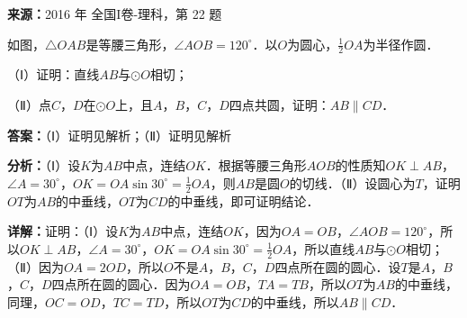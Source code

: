 \begin{question}[points=10]
\textbf{来源：}2016 年 全国I卷-理科，第 22 题\par
如图，$\triangle OAB$是等腰三角形，$\angle AOB=120^\circ$．以$O$为圆心，$\frac{1}{2}OA$为半径作圆．

（Ⅰ）证明：直线$AB$与$\odot O$相切；

（Ⅱ）点$C$，$D$在$\odot O$上，且$A$，$B$，$C$，$D$四点共圆，证明：$AB\parallel CD$．
\begin{solution}
\textbf{答案：}（Ⅰ）证明见解析；（Ⅱ）证明见解析

\textbf{分析：}（Ⅰ）设$K$为$AB$中点，连结$OK$．根据等腰三角形$AOB$的性质知$OK\perp AB$，$\angle A=30^\circ$，$OK=OA\sin30^\circ=\frac{1}{2}OA$，则$AB$是圆$O$的切线．（Ⅱ）设圆心为$T$，证明$OT$为$AB$的中垂线，$OT$为$CD$的中垂线，即可证明结论．

\textbf{详解：}证明：（Ⅰ）设$K$为$AB$中点，连结$OK$，因为$OA=OB$，$\angle AOB=120^\circ$，所以$OK\perp AB$，$\angle A=30^\circ$，$OK=OA\sin30^\circ=\frac{1}{2}OA$，所以直线$AB$与$\odot O$相切；（Ⅱ）因为$OA=2OD$，所以$O$不是$A$，$B$，$C$，$D$四点所在圆的圆心．设$T$是$A$，$B$，$C$，$D$四点所在圆的圆心．因为$OA=OB$，$TA=TB$，所以$OT$为$AB$的中垂线，同理，$OC=OD$，$TC=TD$，所以$OT$为$CD$的中垂线，所以$AB\parallel CD$．
\end{solution}
\end{question}

